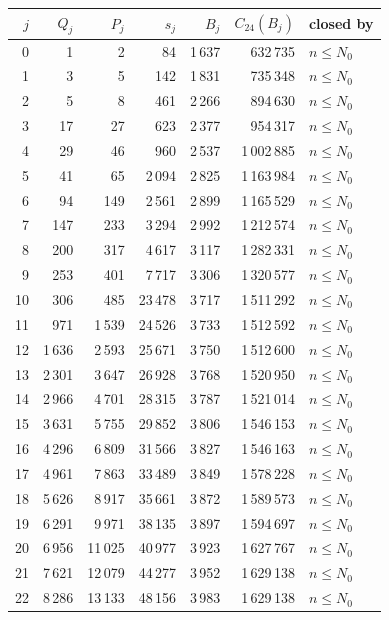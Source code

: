\documentclass[11pt]{amsart}
\theoremstyle{definition}
\theoremstyle{remark}
\begin{document}
\begin{center}
\footnotesize
\begin{tabular}{@{}rrrrrrl@{}}
\toprule
$j$ & $Q_j$ & $P_j$ & $s_j$ & $B_j$ & $C_{24}(B_j)$ & closed by \\
\midrule
0 & 1 & 2 & 84 & 1\,637 & 632\,735 & $n\le N_0$ \\
1 & 3 & 5 & 142 & 1\,831 & 735\,348 & $n\le N_0$ \\
2 & 5 & 8 & 461 & 2\,266 & 894\,630 & $n\le N_0$ \\
3 & 17 & 27 & 623 & 2\,377 & 954\,317 & $n\le N_0$ \\
4 & 29 & 46 & 960 & 2\,537 & 1\,002\,885 & $n\le N_0$ \\
5 & 41 & 65 & 2\,094 & 2\,825 & 1\,163\,984 & $n\le N_0$ \\
6 & 94 & 149 & 2\,561 & 2\,899 & 1\,165\,529 & $n\le N_0$ \\
7 & 147 & 233 & 3\,294 & 2\,992 & 1\,212\,574 & $n\le N_0$ \\
8 & 200 & 317 & 4\,617 & 3\,117 & 1\,282\,331 & $n\le N_0$ \\
9 & 253 & 401 & 7\,717 & 3\,306 & 1\,320\,577 & $n\le N_0$ \\
10 & 306 & 485 & 23\,478 & 3\,717 & 1\,511\,292 & $n\le N_0$ \\
11 & 971 & 1\,539 & 24\,526 & 3\,733 & 1\,512\,592 & $n\le N_0$ \\
12 & 1\,636 & 2\,593 & 25\,671 & 3\,750 & 1\,512\,600 & $n\le N_0$ \\
13 & 2\,301 & 3\,647 & 26\,928 & 3\,768 & 1\,520\,950 & $n\le N_0$ \\
14 & 2\,966 & 4\,701 & 28\,315 & 3\,787 & 1\,521\,014 & $n\le N_0$ \\
15 & 3\,631 & 5\,755 & 29\,852 & 3\,806 & 1\,546\,153 & $n\le N_0$ \\
16 & 4\,296 & 6\,809 & 31\,566 & 3\,827 & 1\,546\,163 & $n\le N_0$ \\
17 & 4\,961 & 7\,863 & 33\,489 & 3\,849 & 1\,578\,228 & $n\le N_0$ \\
18 & 5\,626 & 8\,917 & 35\,661 & 3\,872 & 1\,589\,573 & $n\le N_0$ \\
19 & 6\,291 & 9\,971 & 38\,135 & 3\,897 & 1\,594\,697 & $n\le N_0$ \\
20 & 6\,956 & 11\,025 & 40\,977 & 3\,923 & 1\,627\,767 & $n\le N_0$ \\
21 & 7\,621 & 12\,079 & 44\,277 & 3\,952 & 1\,629\,138 & $n\le N_0$ \\
22 & 8\,286 & 13\,133 & 48\,156 & 3\,983 & 1\,629\,138 & $n\le N_0$ \\

\end{tabular}
\end{center}
\end{document}
